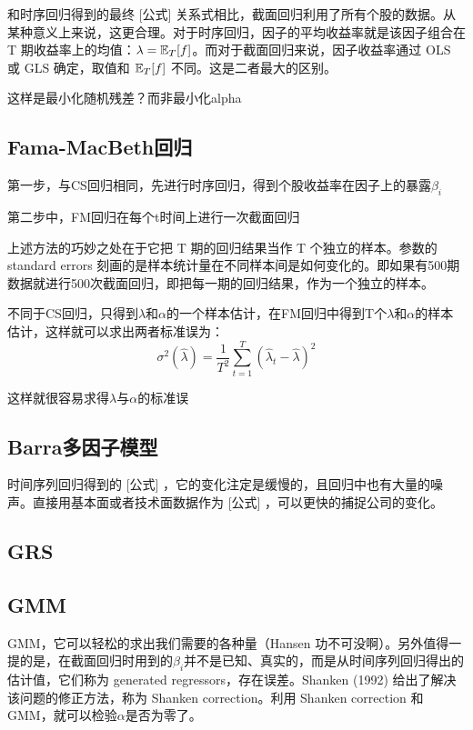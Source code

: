 \documentclass[11pt]{article}
\begin{document}
和时序回归得到的最终 [公式] 关系式相比，截面回归利用了所有个股的数据。从某种意义上来说，这更合理。对于时序回归，因子的平均收益率就是该因子组合在 T 期收益率上的均值：$\lambda=\mathbb{E}_T[f]$。而对于截面回归来说，因子收益率通过 OLS 或 GLS 确定，取值和 $\mathbb{E}_T[f]$ 不同。这是二者最大的区别。

这样是最小化随机残差？而非最小化alpha

\subsection{Fama-MacBeth回归}

第一步，与CS回归相同，先进行时序回归，得到个股收益率在因子上的暴露$\beta_i$

第二步中，FM回归在每个t时间上进行一次截面回归

上述方法的巧妙之处在于它把 T 期的回归结果当作 T 个独立的样本。参数的 standard errors 刻画的是样本统计量在不同样本间是如何变化的。即如果有500期数据就进行500次截面回归，即把每一期的回归结果，作为一个独立的样本。

不同于CS回归，只得到$\lambda$和$\alpha$的一个样本估计，在FM回归中得到T个$\lambda$和$\alpha$的样本估计，这样就可以求出两者标准误为：
\begin{equation*}
    \sigma^2(\hat{\lambda}) = \frac{1}{T^2} \sum_{t=1}^{T} \left( \hat{\lambda}_t - \hat{\lambda} \right)^2
\end{equation*}

这样就很容易求得$\lambda$与$\alpha$的标准误

\subsection{Barra多因子模型}

时间序列回归得到的 [公式] ，它的变化注定是缓慢的，且回归中也有大量的噪声。直接用基本面或者技术面数据作为 [公式] ，可以更快的捕捉公司的变化。

\subsection{GRS}

\subsection{GMM}

 GMM，它可以轻松的求出我们需要的各种量（Hansen 功不可没啊）。另外值得一提的是，在截面回归时用到的$\beta_i$并不是已知、真实的，而是从时间序列回归得出的估计值，它们称为 generated regressors，存在误差。Shanken (1992) 给出了解决该问题的修正方法，称为 Shanken correction。利用 Shanken correction 和 GMM，就可以检验$\alpha$是否为零了。
\end{document}
